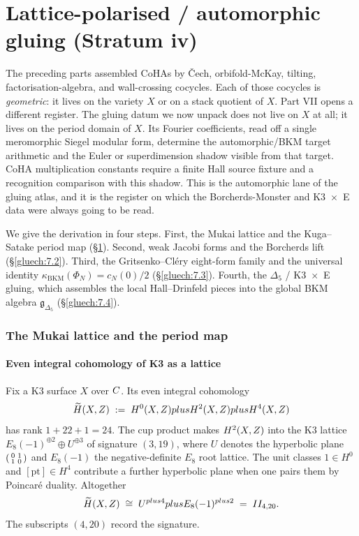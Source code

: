 %
%

\part{Lattice-polarised / automorphic gluing (Stratum iv)}
\label{part:gluing-lattice-automorphic}

The preceding parts assembled CoHAs by Čech, orbifold-McKay, tilting, factorisation-algebra, and wall-crossing cocycles. Each of those cocycles is \emph{geometric}: it lives on the variety $X$ or on a stack quotient of $X$. Part VII opens a different register. The gluing datum we now unpack does not live on $X$ at all; it lives on the period domain of $X$. Its Fourier coefficients, read off a single meromorphic Siegel modular form, determine the automorphic/BKM target arithmetic and the Euler or superdimension shadow visible from that target. CoHA multiplication constants require a finite Hall source fixture and a recognition comparison with this shadow. This is the automorphic lane of the gluing atlas, and it is the register on which the Borcherds-Monster and K3~$\times$~E data were always going to be read.

We give the derivation in four steps. First, the Mukai lattice and the Kuga--Satake period map (\S\ref{gluech:7.1}). Second, weak Jacobi forms and the Borcherds lift (\S\ref{gluech:7.2}). Third, the Gritsenko--Cl\'ery eight-form family and the universal identity $\kappa_{\mathrm{BKM}}(\Phi_N) = c_N(0)/2$ (\S\ref{gluech:7.3}). Fourth, the $\Delta_5$ / K3~$\times$~E gluing, which assembles the local Hall--Drinfeld pieces into the global BKM algebra $\mathfrak{g}_{\Delta_5}$ (\S\ref{gluech:7.4}).

\section{The Mukai lattice and the period map}
\label{gluech:7.1}

\subsection{Even integral cohomology of K3 as a lattice}

Fix a K3 surface $X$ over $C$. Its even integral cohomology
\[
  \widetilde H(X, Z) \;:=\; H^0(X, Z) plus H^2(X, Z) plus H^4(X, Z)
\]
has rank $1 + 22 + 1 = 24$. The cup product makes $H^2(X, Z)$ into the $\mathrm{K3}$ lattice $E_8(-1)^{\oplus 2} \oplus U^{\oplus 3}$ of signature $(3, 19)$, where $U$ denotes the hyperbolic plane $\begin{psmallmatrix} 0 & 1 \\ 1 & 0 \end{psmallmatrix}$ and $E_8(-1)$ the negative-definite $E_8$ root lattice. The unit classes $1 \in H^0$ and $[\mathrm{pt}] \in H^4$ contribute a further hyperbolic plane when one pairs them by Poincar\'e duality. Altogether
\[
  \widetilde H(X, Z) \;\cong\; U^{plus 4} plus E_8(-1)^{plus 2} \;=\; II_{4, 20}.
\]
The subscripts $(4, 20)$ record the signature.

